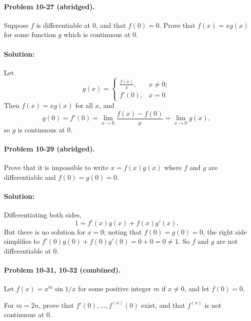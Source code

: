 \documentclass{article}
\begin{document}
\paragraph{Problem 10-27 (abridged).} Suppose $f$ is differentiable at 0, and
that $f(0) = 0$. Prove that $f(x) = xg(x)$ for some function $g$ which is
continuous at 0.

\paragraph{Solution:} Let \begin{equation*}
  g(x) = \begin{cases}
    \frac{f(x)}{x}, &x \neq 0; \\
    f'(0), &x = 0.
  \end{cases}
\end{equation*}
Then $f(x) = xg(x)$ for all $x$, and \begin{equation*}
  g(0) = f'(0) = \lim_{x \rightarrow 0}\frac{f(x) - f(0)}{x} = \lim_{x
    \rightarrow 0}g(x),
\end{equation*} so $g$ is continuous at 0.

\paragraph{Problem 10-29 (abridged).} Prove that it is impossible to write $x =
f(x)g(x)$ where $f$ and $g$ are differentiable and $f(0) = g(0) = 0$.

\paragraph{Solution:} Differentiating both sides, \begin{equation*}
  1 = f'(x)g(x) + f(x)g'(x).
\end{equation*}
But there is no solution for $x = 0$; noting that $f(0) = g(0) = 0$, the right
side simplifies to $f'(0)g(0) + f(0)g'(0) = 0 + 0 = 0 \neq 1$. So $f$ and $g$
are not differentiable at 0.

\paragraph{Problem 10-31, 10-32 (combined).} Let $f(x) = x^m\sin{1/x}$ for some
positive integer $m$ if $x \neq 0$, and let $f(0) = 0$.

For $m = 2n$, prove that $f'(0), \ldots, f^{(n)}(0)$ exist, and that $f^{(n)}$
is not continuous at 0.
\end{document}
